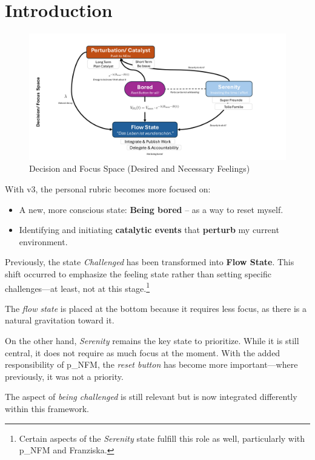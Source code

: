 \section{Introduction}  
\begin{figure}[H]  
	\centering  
	\includegraphics[scale=0.5]{attachment/chapter_OWN/DSci_Rubic__Personal_III}  
	\caption{Decision and Focus Space (Desired and Necessary Feelings)}  
\end{figure}  

With v3, the personal rubric becomes more focused on:  
\begin{itemize}  
\item A new, more conscious state: \textbf{Being bored} – as a way to reset myself.  
\item Identifying and initiating \textbf{catalytic events} that \textbf{perturb} my current environment.  
\end{itemize}  

Previously, the state \textit{Challenged} has been transformed into \textbf{Flow State}. This shift occurred to emphasize the feeling state rather than setting specific challenges—at least, not at this stage.\footnote{  
Certain aspects of the \textit{Serenity} state fulfill this role as well, particularly with \gls{p_NFM} and Franziska.  
}  

The \textit{flow state} is placed at the bottom because it requires less focus, as there is a natural gravitation toward it.  

On the other hand, \textit{Serenity} remains the key state to prioritize. While it is still central, it does not require as much focus at the moment. With the added responsibility of \gls{p_NFM}, the \textit{reset button} has become more important—where previously, it was not a priority.  

The aspect of \textit{being challenged} is still relevant but is now integrated differently within this framework.  


